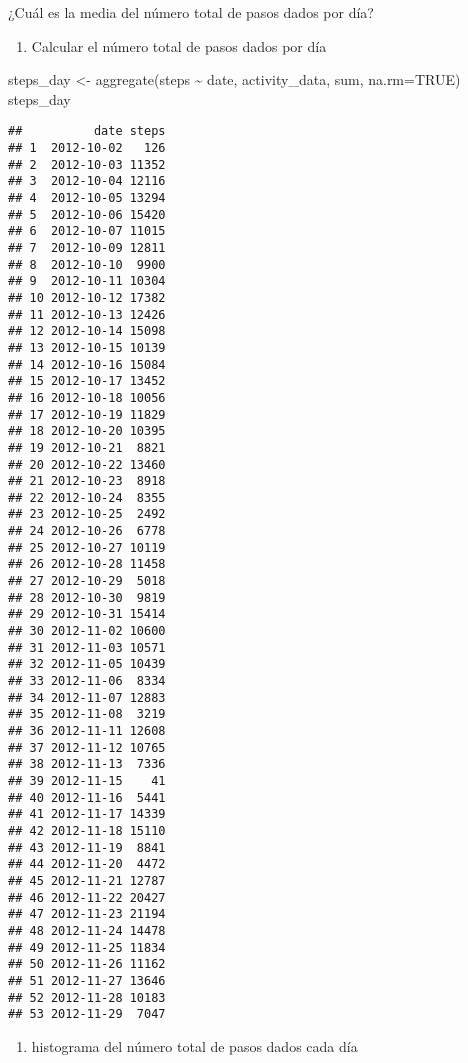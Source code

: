 \documentclass[
]{article}
\newenvironment{Shaded}{\begin{snugshade}}{\end{snugshade}}
\newcommand{\AttributeTok}[1]{\textcolor[rgb]{0.77,0.63,0.00}{#1}}
\newcommand{\ConstantTok}[1]{\textcolor[rgb]{0.00,0.00,0.00}{#1}}
\newcommand{\FunctionTok}[1]{\textcolor[rgb]{0.00,0.00,0.00}{#1}}
\newcommand{\NormalTok}[1]{#1}
\newcommand{\OtherTok}[1]{\textcolor[rgb]{0.56,0.35,0.01}{#1}}
\newcommand{\SpecialCharTok}[1]{\textcolor[rgb]{0.00,0.00,0.00}{#1}}
\providecommand{\tightlist}{%
  \setlength{\itemsep}{0pt}\setlength{\parskip}{0pt}}
\begin{document}
¿Cuál es la media del número total de pasos dados por día?

\begin{enumerate}
\def\labelenumi{\arabic{enumi}.}
\tightlist
\item
  Calcular el número total de pasos dados por día
\end{enumerate}

\begin{Shaded}
\begin{Highlighting}[]
\NormalTok{steps\_day }\OtherTok{\textless{}{-}} \FunctionTok{aggregate}\NormalTok{(steps }\SpecialCharTok{\textasciitilde{}}\NormalTok{ date, activity\_data, sum, }\AttributeTok{na.rm=}\ConstantTok{TRUE}\NormalTok{)}
\NormalTok{steps\_day}
\end{Highlighting}
\end{Shaded}

\begin{verbatim}
##          date steps
## 1  2012-10-02   126
## 2  2012-10-03 11352
## 3  2012-10-04 12116
## 4  2012-10-05 13294
## 5  2012-10-06 15420
## 6  2012-10-07 11015
## 7  2012-10-09 12811
## 8  2012-10-10  9900
## 9  2012-10-11 10304
## 10 2012-10-12 17382
## 11 2012-10-13 12426
## 12 2012-10-14 15098
## 13 2012-10-15 10139
## 14 2012-10-16 15084
## 15 2012-10-17 13452
## 16 2012-10-18 10056
## 17 2012-10-19 11829
## 18 2012-10-20 10395
## 19 2012-10-21  8821
## 20 2012-10-22 13460
## 21 2012-10-23  8918
## 22 2012-10-24  8355
## 23 2012-10-25  2492
## 24 2012-10-26  6778
## 25 2012-10-27 10119
## 26 2012-10-28 11458
## 27 2012-10-29  5018
## 28 2012-10-30  9819
## 29 2012-10-31 15414
## 30 2012-11-02 10600
## 31 2012-11-03 10571
## 32 2012-11-05 10439
## 33 2012-11-06  8334
## 34 2012-11-07 12883
## 35 2012-11-08  3219
## 36 2012-11-11 12608
## 37 2012-11-12 10765
## 38 2012-11-13  7336
## 39 2012-11-15    41
## 40 2012-11-16  5441
## 41 2012-11-17 14339
## 42 2012-11-18 15110
## 43 2012-11-19  8841
## 44 2012-11-20  4472
## 45 2012-11-21 12787
## 46 2012-11-22 20427
## 47 2012-11-23 21194
## 48 2012-11-24 14478
## 49 2012-11-25 11834
## 50 2012-11-26 11162
## 51 2012-11-27 13646
## 52 2012-11-28 10183
## 53 2012-11-29  7047
\end{verbatim}

\begin{enumerate}
\def\labelenumi{\arabic{enumi}.}
\setcounter{enumi}{1}
\tightlist
\item
  histograma del número total de pasos dados cada día
\end{enumerate}
\end{document}

